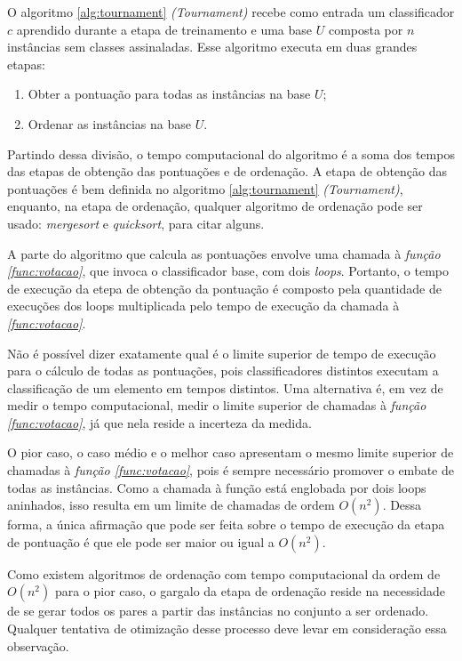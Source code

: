 O algoritmo \ref{alg:tournament} \emph{(Tournament)} recebe como entrada um classificador $c$ aprendido durante a etapa de treinamento e uma base $U$ composta por $n$ instâncias sem classes assinaladas. Esse algoritmo executa em duas grandes etapas:

\begin{enumerate}
    \item Obter a pontuação para todas as instâncias na base $U$;
    \item Ordenar as instâncias na base $U$.
\end{enumerate}

Partindo dessa divisão, o tempo computacional do algoritmo é a soma dos tempos das etapas de obtenção das pontuações e de ordenação. A etapa de obtenção das pontuações é bem definida no algoritmo \ref{alg:tournament} \emph{(Tournament)}, enquanto, na etapa de ordenação, qualquer algoritmo de ordenação pode ser usado: \emph{mergesort} e \emph{quicksort}, para citar alguns.

A parte do algoritmo que calcula as pontuações envolve uma chamada à \emph{função \ref{func:votacao}}, que invoca o classificador base, com dois \emph{loops}. Portanto, o tempo de execução da etepa de obtenção da pontuação é composto pela quantidade de execuções dos loops multiplicada pelo tempo de execução da chamada à \emph{\ref{func:votacao}}.

Não é possível dizer exatamente qual é o limite superior de tempo de execução para o cálculo de todas as pontuações, pois classificadores distintos executam a classificação de um elemento em tempos distintos. Uma alternativa é, em vez de medir o tempo computacional, medir o limite superior de chamadas à \emph{função \ref{func:votacao}}, já que nela reside a incerteza da medida.

O pior caso, o caso médio e o melhor caso apresentam o mesmo limite superior de chamadas à \emph{função \ref{func:votacao}}, pois é sempre necessário promover o embate de todas as instâncias. Como a chamada à função está englobada por dois loops aninhados, isso resulta em um limite de chamadas de ordem $O(n^2)$. Dessa forma, a única afirmação que pode ser feita sobre o tempo de execução da etapa de pontuação é que ele pode ser maior ou igual a $O(n^2)$.

Como existem algoritmos de ordenação com tempo computacional da ordem de $O(n^2)$ para o pior caso, o gargalo da etapa de ordenação reside na necessidade de se gerar todos os pares a partir das instâncias no conjunto a ser ordenado. Qualquer tentativa de otimização desse processo deve levar em consideração essa observação.


